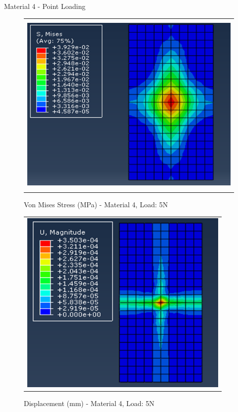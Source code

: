 \documentclass[a4paper,12pt]{article}
\numberwithin{equation}{section}
\numberwithin{figure}{section}
\begin{document}

\newpage
\noindent Material 4 - Point Loading 
\begin{figure}[H]
  \centering
  \begin{tabular}{@{}c@{}}
    \includegraphics[width=0.7\linewidth,height=255pt]{Results/Point Loading/M4_VMS_L1.png} \\
  \end{tabular}
  \caption{Von Mises Stress (MPa) - Material 4, Load: 5N}
\end{figure}

\begin{figure}[H]
  \centering
  \begin{tabular}{@{}c@{}}
    \includegraphics[width=0.7\linewidth,height=255pt]{Results/Point Loading/M4_DIS_L1.png} \\
  \end{tabular}
  \caption{Displacement (mm) - Material 4, Load: 5N}
\end{figure}
\end{document}
